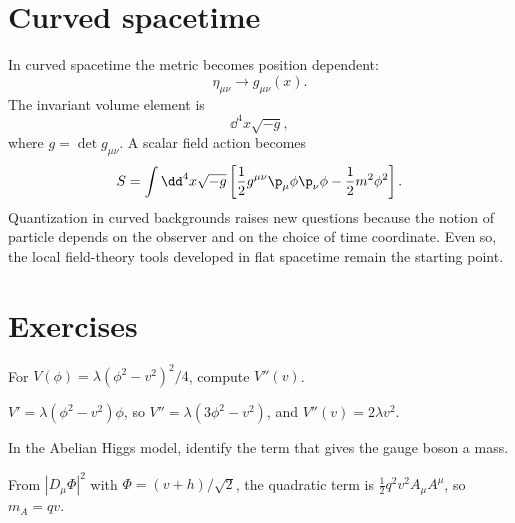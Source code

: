 \section{Curved spacetime}

In curved spacetime the metric becomes position dependent:
\[
  \eta_{\mu\nu}\to g_{\mu\nu}(x).
\]
The invariant volume element is
\[
  \dd^4x\sqrt{-g},
\]
where \(g=\det g_{\mu\nu}\).  A scalar field action becomes
\[
  S=\int\dd^4x\sqrt{-g}
  \left[
  \frac12g^{\mu\nu}\p_\mu\phi\p_\nu\phi
  -\frac12m^2\phi^2
  \right].
\]
Quantization in curved backgrounds raises new questions because the notion of particle depends on the observer and on the choice of time coordinate.  Even so, the local field-theory tools developed in flat spacetime remain the starting point.

\section*{Exercises}

\begin{exercise}
For \(V(\phi)=\lambda(\phi^2-v^2)^2/4\), compute \(V''(v)\).
\begin{answer}
\(V'=\lambda(\phi^2-v^2)\phi\), so \(V''=\lambda(3\phi^2-v^2)\), and \(V''(v)=2\lambda v^2\).
\end{answer}
\end{exercise}

\begin{exercise}
In the Abelian Higgs model, identify the term that gives the gauge boson a mass.
\begin{answer}
From \(|D_\mu\Phi|^2\) with \(\Phi=(v+h)/\sqrt2\), the quadratic term is \(\frac12q^2v^2A_\mu A^\mu\), so \(m_A=qv\).
\end{answer}
\end{exercise}

